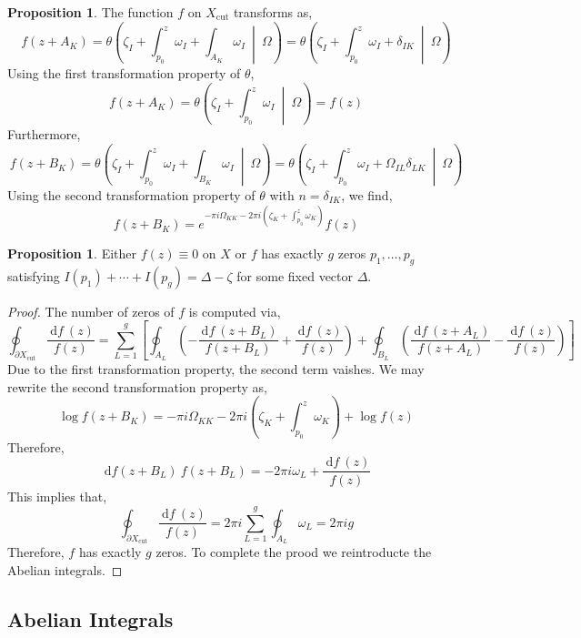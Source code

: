 \documentclass[12pt]{extarticle}
\renewcommand{\d}[1]{\: \mathrm{d}#1 \:}
\theoremstyle{definition}
\newtheorem{proposition}[theorem]{Proposition}
\newcommand{\Xcut}{X_{\text{cut}}}
\begin{document}
\begin{proposition}
The function $f$ on $\Xcut$ transforms as,
\[ f(z + A_K) = \theta\left(\zeta_I + \int_{p_0}^z \omega_I + \int_{A_K} \omega_I \: \middle| \: \Omega \right) = \theta\left(\zeta_I + \int_{p_0}^z \omega_I + \delta_{IK} \: \middle| \: \Omega \right) \]
Using the first transformation property of $\theta$,
\[ f(z + A_K) = \theta\left(\zeta_I + \int_{p_0}^z \omega_I  \: \middle| \: \Omega \right) = f(z) \]
Furthermore,
\[ f(z + B_K) = \theta\left(\zeta_I + \int_{p_0}^z \omega_I + \int_{B_K} \omega_I \: \middle| \: \Omega \right) = \theta\left(\zeta_I + \int_{p_0}^z \omega_I + \Omega_{IL} \delta_{LK} \: \middle| \: \Omega \right) \]
Using the second transformation property of $\theta$ with $n = \delta_{IK}$, we find,
\[ f(z + B_K) = e^{-\pi i \Omega_{KK} - 2 \pi i \left( \zeta_K + \int_{p_0}^z \omega_K \right)} f(z) \]
\end{proposition}
\begin{proposition}
Either $f(z) \equiv 0$ on $X$ or $f$ has exactly $g$ zeros $p_1, \dots, p_g$ satisfying $I(p_1) + \cdots + I(p_g) = \Delta - \zeta$ for some fixed vector $\Delta$. 
\end{proposition}

\begin{proof}
The number of zeros of $f$ is computed via,
\[ \oint_{\partial \Xcut} \frac{\d{f}(z)}{f(z)} = \sum_{L = 1}^g \left[ \oint_{A_L} \left(- \frac{\d{f}(z + B_L)}{f(z + B_L)}  + \frac{\d{f}(z)}{f(z)} \right) + \oint_{B_L} \left( \frac{\d{f}(z + A_L)}{f(z + A_L)} - \frac{\d{f}(z)}{f(z)} \right) \right] \]
Due to the first transformation property, the second term vaishes. We may rewrite the second transformation property as,
\[ \log{f(z + B_K)} = - \pi i \Omega_{KK} - 2 \pi i \left( \zeta_K + \int_{p_0}^z \omega_K \right) + \log{f(z)} \]
Therefore,
\[ \d{f(z + B_L)}{f(z + B_L)} = - 2 \pi i \omega_L + \frac{\d{f}(z)}{f(z)} \]
This implies that,
\[ \oint_{\partial \Xcut} \frac{\d{f}(z)}{f(z)} = 2 \pi i \sum_{L = 1}^g \oint_{A_L} \omega_L = 2 \pi i g   \]
Therefore, $f$ has exactly $g$ zeros. To complete the prood we reintroducte the Abelian integrals. 
\end{proof}

\subsection{Abelian Integrals}
\end{document}
